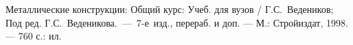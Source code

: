 \begin{thebibliography}{99}
 Металлические конструкции: Общий курс: Учеб. для вузов / Г.С.~Ведеников; 
Под ред. Г.С.~Веденикова.~---~7-е~изд., перераб. и доп. --- М.: Стройиздат, 1998. --- 760 с.: ил.

\end{thebibliography}